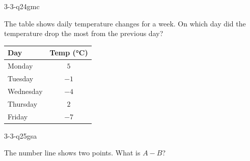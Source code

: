 \begin{practiceQuestion}{3-3-q24}{gmc}
\begin{questionText}
The table shows daily temperature changes for a week. On which day did the temperature drop the most from the previous day?

\begin{center}
\begin{tabular}{|l|c|}
\hline
\textbf{Day} & \textbf{Temp (°C)} \\
\hline
Monday & $5$ \\ \hline
Tuesday & $-1$ \\ \hline
Wednesday & $-4$ \\ \hline
Thursday & $2$ \\ \hline
Friday & $-7$ \\ \hline
\end{tabular}
\end{center}
\end{questionText}
\end{practiceQuestion}

\begin{practiceQuestion}{3-3-q25}{gsa}
\begin{questionText}
The number line shows two points. What is $A - B$?

\begin{center}
\end{center}
\end{questionText}
\end{practiceQuestion}

